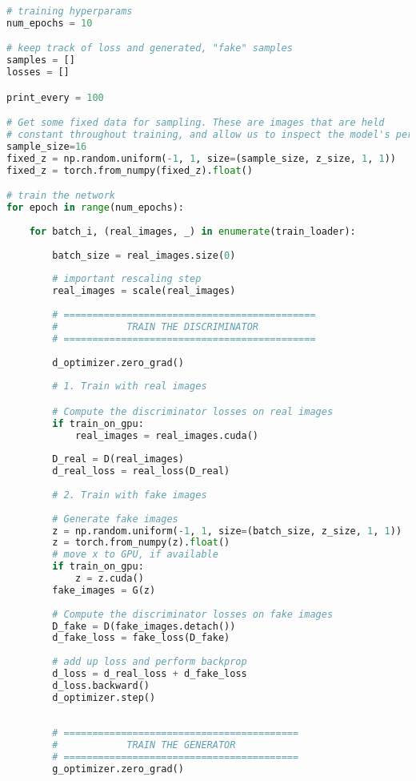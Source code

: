 \begin{lstlisting}[language=Python]
# training hyperparams
num_epochs = 10

# keep track of loss and generated, "fake" samples
samples = []
losses = []

print_every = 100

# Get some fixed data for sampling. These are images that are held
# constant throughout training, and allow us to inspect the model's performance
sample_size=16
fixed_z = np.random.uniform(-1, 1, size=(sample_size, z_size, 1, 1))
fixed_z = torch.from_numpy(fixed_z).float()

# train the network
for epoch in range(num_epochs):
    
    for batch_i, (real_images, _) in enumerate(train_loader):
                
        batch_size = real_images.size(0)
        
        # important rescaling step
        real_images = scale(real_images)
        
        # ============================================
        #            TRAIN THE DISCRIMINATOR
        # ============================================
        
        d_optimizer.zero_grad()
        
        # 1. Train with real images

        # Compute the discriminator losses on real images 
        if train_on_gpu:
            real_images = real_images.cuda()
        
        D_real = D(real_images)
        d_real_loss = real_loss(D_real)
        
        # 2. Train with fake images
        
        # Generate fake images
        z = np.random.uniform(-1, 1, size=(batch_size, z_size, 1, 1))
        z = torch.from_numpy(z).float()
        # move x to GPU, if available
        if train_on_gpu:
            z = z.cuda()
        fake_images = G(z)
        
        # Compute the discriminator losses on fake images            
        D_fake = D(fake_images.detach())
        d_fake_loss = fake_loss(D_fake)
        
        # add up loss and perform backprop
        d_loss = d_real_loss + d_fake_loss
        d_loss.backward()
        d_optimizer.step()
        
        
        # =========================================
        #            TRAIN THE GENERATOR
        # =========================================
        g_optimizer.zero_grad()
        

\end{lstlisting}
